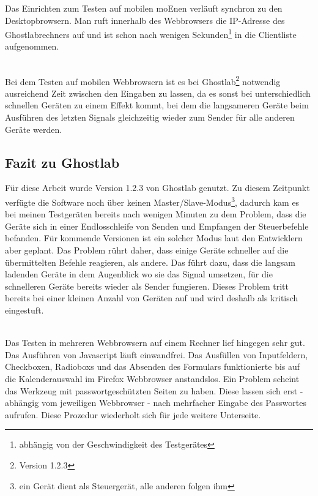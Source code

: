 		Das Einrichten zum Testen auf mobilen \Gls{moEn}en verläuft synchron zu den Desktopbrowsern. Man ruft innerhalb des \Gls{Webbrowser}s die IP-Adresse des Ghostlabrechners auf und ist schon nach wenigen Sekunden\footnote{abhängig von der Geschwindigkeit des Testgerätes} in die Clientliste aufgenommen.
		
		\\Bei dem Testen auf mobilen \Gls{Webbrowser}n ist es bei Ghostlab\footnote{Version 1.2.3} notwendig ausreichend Zeit zwischen den Eingaben zu lassen, da es sonst bei unterschiedlich schnellen Geräten zu einem Effekt kommt, bei dem die langsameren Geräte beim Ausführen des letzten Signals gleichzeitig wieder zum Sender für alle anderen Geräte werden.
		
		\pagebreak
		
		\subsection{Fazit zu Ghostlab}
		Für diese Arbeit wurde Version 1.2.3 von Ghostlab genutzt. Zu diesem Zeitpunkt verfügte die Software noch über keinen Master/Slave-Modus\footnote{ein Gerät dient als Steuergerät, alle anderen folgen ihm}, dadurch kam es bei meinen Testgeräten bereits nach wenigen Minuten zu dem Problem, dass die Geräte sich in einer Endlosschleife von Senden und Empfangen der Steuerbefehle befanden. Für kommende Versionen ist ein solcher Modus laut den Entwicklern aber geplant. Das Problem rührt daher, dass einige Geräte schneller auf die übermittelten Befehle reagieren, als andere. Das führt dazu, dass die langsam ladenden Geräte in dem Augenblick wo sie das Signal umsetzen, für die schnelleren Geräte bereits wieder als Sender fungieren. Dieses Problem tritt bereits bei einer kleinen Anzahl von Geräten auf und wird deshalb als kritisch eingestuft. 

		\\Das Testen in mehreren \Gls{Webbrowser}n auf einem Rechner lief hingegen sehr gut. Das Ausführen von \Gls{Javascript} läuft einwandfrei. Das Ausfüllen von \Gls{Input}feldern, \Gls{Checkbox}en, \Gls{Radiobox}s und das Absenden des Formulars funktionierte bis auf die Kalenderauswahl im Firefox \Gls{Webbrowser} anstandslos. Ein Problem scheint das Werkzeug mit passwortgeschützten Seiten zu haben. Diese lassen sich erst - abhängig vom jeweiligen \Gls{Webbrowser} - nach mehrfacher Eingabe des Passwortes aufrufen. Diese Prozedur wiederholt sich für jede weitere Unterseite. 

